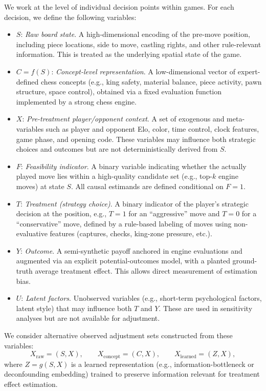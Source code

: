 \documentclass[11pt]{article}
\begin{document}
We work at the level of individual decision points within games. For each decision, we define the following variables:

\begin{itemize}
\item \(S\): \emph{Raw board state}. A high-dimensional encoding of the pre-move position, including piece locations, side to move, castling rights, and other rule-relevant information. This is treated as the underlying spatial state of the game.
\item \(C = f(S)\): \emph{Concept-level representation}. A low-dimensional vector of expert-defined chess concepts (e.g., king safety, material balance, piece activity, pawn structure, space control), obtained via a fixed evaluation function implemented by a strong chess engine.\cite{lemeire2005causalmodelsinchess,stockfish}
\item \(X\): \emph{Pre-treatment player/opponent context}. A set of exogenous and meta-variables such as player and opponent Elo, color, time control, clock features, game phase, and opening code. These variables may influence both strategic choices and outcomes but are not deterministically derived from \(S\).
\item \(F\): \emph{Feasibility indicator}. A binary variable indicating whether the actually played move lies within a high-quality candidate set (e.g., top-\(k\) engine moves) at state \(S\). All causal estimands are defined conditional on \(F=1\).
\item \(T\): \emph{Treatment (strategy choice)}. A binary indicator of the player's strategic decision at the position, e.g., \(T=1\) for an ``aggressive'' move and \(T=0\) for a ``conservative'' move, defined by a rule-based labeling of moves using non-evaluative features (captures, checks, king-zone pressure, etc.).
\item \(Y\): \emph{Outcome}. A semi-synthetic payoff anchored in engine evaluations and augmented via an explicit potential-outcomes model, with a planted ground-truth average treatment effect. This allows direct measurement of estimation bias.
\item \(U\): \emph{Latent factors}. Unobserved variables (e.g., short-term psychological factors, latent style) that may influence both \(T\) and \(Y\). These are used in sensitivity analyses but are not available for adjustment.
\end{itemize}

We consider alternative observed adjustment sets constructed from these variables:
\[
X_{\text{raw}} = (S, X), \qquad
X_{\text{concept}} = (C, X), \qquad
X_{\text{learned}} = (Z, X),
\]
where \(Z = g(S, X)\) is a learned representation (e.g., information-bottleneck or deconfounding embedding) trained to preserve information relevant for treatment effect estimation.\cite{kuang2020information,deconfoundingScores}
\end{document}
